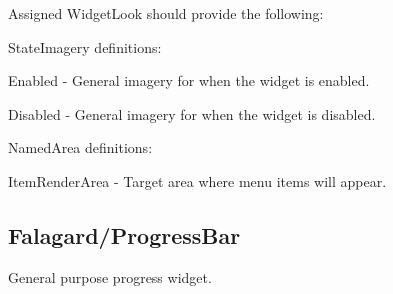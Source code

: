 Assigned Widget\+Look should provide the following\+: 
\begin{DoxyItemize}
\item State\+Imagery definitions\+: 
\begin{DoxyItemize}
\item Enabled -\/ General imagery for when the widget is enabled. 
\item Disabled -\/ General imagery for when the widget is disabled. 
\end{DoxyItemize}


\item Named\+Area definitions\+: 
\begin{DoxyItemize}
\item Item\+Render\+Area -\/ Target area where menu items will appear. 
\end{DoxyItemize}
\end{DoxyItemize}\hypertarget{fal_wr_ref_fal_wr_ref_sec_15}{}\subsection{Falagard/\+Progress\+Bar}\label{fal_wr_ref_fal_wr_ref_sec_15}
General purpose progress widget.

